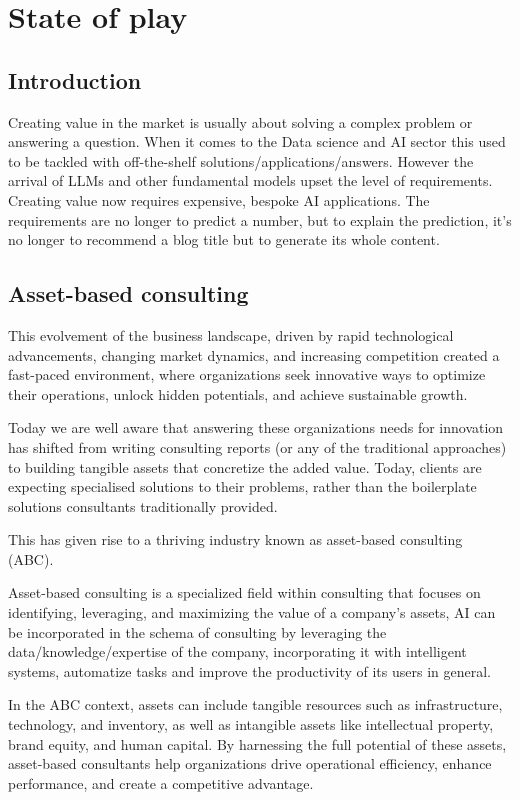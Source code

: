 \documentclass[a4paper,12pt]{article}
\begin{document}
\section{State of play}
\subsection{Introduction}
Creating value in the market is usually about solving a complex problem or answering a question. When it comes to the Data science and AI sector this used to be tackled with off-the-shelf solutions/applications/answers.
However the arrival of LLMs and other fundamental models upset the level of requirements. Creating value now requires expensive,  bespoke AI applications. The requirements are no longer to predict a number, but to explain the prediction, it's no longer to recommend a blog title but to generate its whole content.   

\subsection{Asset-based consulting}
This evolvement of the business landscape, driven by rapid technological advancements, changing market dynamics, and increasing competition created a fast-paced environment, where organizations seek innovative ways to optimize their operations, unlock hidden potentials, and achieve sustainable growth. 

Today we are well aware that answering these organizations needs for innovation has shifted from writing consulting reports (or any of the traditional approaches) to building tangible assets that concretize the added value. Today, clients are expecting specialised solutions to their problems, rather than the boilerplate solutions consultants traditionally provided.

This has given rise to a thriving industry known as asset-based consulting (ABC).

Asset-based consulting is a specialized field within consulting that focuses on identifying, leveraging, and maximizing the value of a company's assets, AI can be incorporated in the schema of consulting by leveraging the data/knowledge/expertise of the company, incorporating it with intelligent systems, automatize tasks and improve the productivity of its users in general. 

In the ABC context, assets can include tangible resources such as infrastructure, technology, and inventory, as well as intangible assets like intellectual property, brand equity, and human capital. By harnessing the full potential of these assets, asset-based consultants help organizations drive operational efficiency, enhance performance, and create a competitive advantage.
\end{document}
